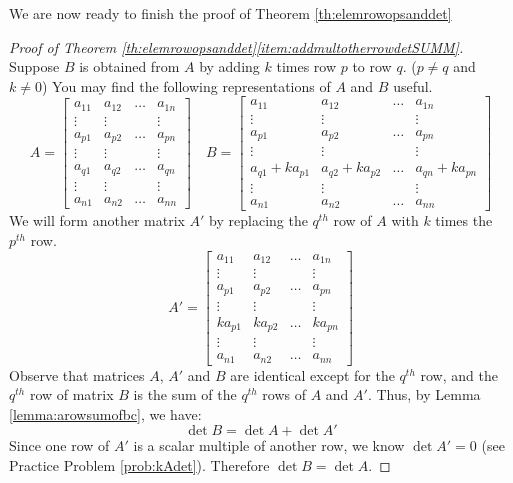 \documentclass{ximera}
\begin{document}
We are now ready to finish the proof of Theorem \ref{th:elemrowopsanddet}
\begin{proof}[Proof of Theorem \ref{th:elemrowopsanddet}\ref{item:addmultotherrowdetSUMM}]
Suppose $B$ is obtained from $A$ by adding $k$ times row $p$ to row $q$.  ($p\neq q$ and $k\neq 0$)  You may find the following representations of $A$ and $B$ useful.
$$A=\begin{bmatrix} a_{11} & a_{12} & \dots  & a_{1n}  \\
   \vdots & \vdots &  & \vdots \\
   a_{p1} & a_{p2} &\dots  & a_{pn}  \\
   \vdots & \vdots &  & \vdots \\
   a_{q1} & a_{q2} &\dots  & a_{qn}  \\
   \vdots & \vdots &  & \vdots  \\
   a_{n1} & a_{n2} & \dots  & a_{nn}\end{bmatrix}\quad
   B=\begin{bmatrix} a_{11} & a_{12} & \dots  & a_{1n}  \\
   \vdots & \vdots &  & \vdots \\
   a_{p1} & a_{p2} & \dots  & a_{pn}  \\
   \vdots & \vdots &  & \vdots \\
   a_{q1}+ka_{p1} & a_{q2}+ka_{p2} &\dots  & a_{qn}+ka_{pn}  \\
   \vdots & \vdots &  & \vdots  \\
   a_{n1} & a_{n2} & \dots  & a_{nn}\end{bmatrix}$$
We will form another matrix $A'$ by replacing the $q^{th}$ row of $A$ with $k$ times the $p^{th}$ row.
$$A'=\begin{bmatrix} a_{11} & a_{12} & \dots  & a_{1n}  \\
   \vdots & \vdots &  & \vdots \\
   a_{p1} & a_{p2} &\dots  & a_{pn}  \\
   \vdots & \vdots &  & \vdots \\
   ka_{p1} & ka_{p2} &\dots  & ka_{pn}  \\
   \vdots & \vdots &  & \vdots  \\
   a_{n1} & a_{n2} & \dots  & a_{nn}\end{bmatrix}$$
Observe that matrices $A$, $A'$ and $B$ are identical except for the $q^{th}$ row, and the $q^{th}$ row of matrix $B$ is the sum of the $q^{th}$ rows of $A$ and $A'$.  Thus, by Lemma \ref{lemma:arowsumofbc}, we have:
$$\det{B}=\det{A}+\det{A'}$$
Since one row of $A'$ is a scalar multiple of another row, we know $\det{A'}=0$ (see Practice Problem \ref{prob:kAdet}). Therefore 
$\det{B}=\det{A}$.
   \end{proof}
\end{document}
